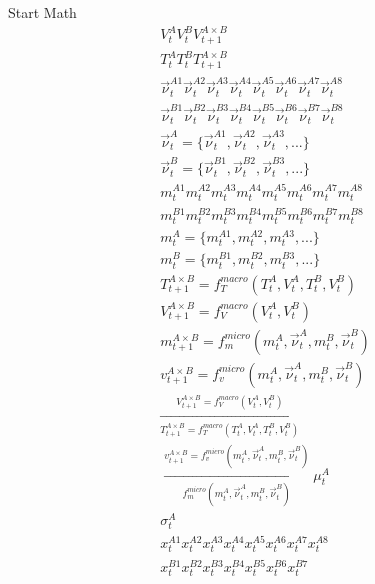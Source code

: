 \documentclass[utf8]{article}
\begin{document}
Start Math
\begin{align*}
&V_{t}^{A}
V_{t}^{B} 
V_{t+1}^{A\times B} \\&
T_{t}^{A}
T_{t}^{B}
T_{t+1}^{A\times B} \\&
\vec{\nu}_{t}^{A1}
\vec{\nu}_{t}^{A2}
\vec{\nu}_{t}^{A3}
\vec{\nu}_{t}^{A4}
\vec{\nu}_{t}^{A5}
\vec{\nu}_{t}^{A6}
\vec{\nu}_{t}^{A7}
\vec{\nu}_{t}^{A8} \\&
\vec{\nu}_{t}^{B1}
\vec{\nu}_{t}^{B2}
\vec{\nu}_{t}^{B3}
\vec{\nu}_{t}^{B4}
\vec{\nu}_{t}^{B5}
\vec{\nu}_{t}^{B6}
\vec{\nu}_{t}^{B7}
\vec{\nu}_{t}^{B8} \\&
\vec{\nu}^A_{t} = \{
\vec{\nu}_{t}^{A1},
\vec{\nu}_{t}^{A2},
\vec{\nu}_{t}^{A3},...\} \\&
\vec{\nu}^B_{t} = \{
\vec{\nu}_{t}^{B1},
\vec{\nu}_{t}^{B2},
\vec{\nu}_{t}^{B3},...\} \\&
{m}_{t}^{A1}
{m}_{t}^{A2}
{m}_{t}^{A3}
{m}_{t}^{A4}
{m}_{t}^{A5}
{m}_{t}^{A6}
{m}_{t}^{A7}
{m}_{t}^{A8} \\&
{m}_{t}^{B1}
{m}_{t}^{B2}
{m}_{t}^{B3}
{m}_{t}^{B4}
{m}_{t}^{B5}
{m}_{t}^{B6}
{m}_{t}^{B7}
{m}_{t}^{B8} \\&
{m}^A_{t} = \{
{m}_{t}^{A1},
{m}_{t}^{A2},
{m}_{t}^{A3},...\} \\&
{m}^B_{t} = \{
{m}_{t}^{B1},
{m}_{t}^{B2},
{m}_{t}^{B3},...\} \\&
T_{t+1}^{A\times B} = f_{T}^{macro}(T_{t}^{A}, V_{t}^{A}, T_{t}^{B}, V_{t}^{B}) \\&
V_{t+1}^{A\times B} = f_{V}^{macro}(V_{t}^{A}, V_{t}^{B}) \\&
{m}^{A\times B}_{t+1} = f_m^{micro}({m}^A_{t},\vec{\nu}^A_{t},{m}^B_{t},\vec{\nu}^B_{t}) \\&
{v}^{A\times B}_{t+1} = f_v^{micro}({m}^A_{t},\vec{\nu}^A_{t},{m}^B_{t},\vec{\nu}^B_{t}) \\&
\xrightarrow[T_{t+1}^{A\times B} = f_{T}^{macro}(T_{t}^{A}, V_{t}^{A}, T_{t}^{B}, V_{t}^{B})]{V_{t+1}^{A\times B} = f_{V}^{macro}(V_{t}^{A}, V_{t}^{B})} \\&
\xrightarrow[f_m^{micro}({m}^A_{t},\vec{\nu}^A_{t},{m}^B_{t},\vec{\nu}^B_{t})]{{v}^{A\times B}_{t+1} = f_v^{micro}({m}^A_{t},\vec{\nu}^A_{t},{m}^B_{t},\vec{\nu}^B_{t})}
{\mu}^A_{t} \\&
{\sigma}^A_{t} \\&
{x}_{t}^{A1}
{x}_{t}^{A2}
{x}_{t}^{A3}
{x}_{t}^{A4}
{x}_{t}^{A5}
{x}_{t}^{A6}
{x}_{t}^{A7}
{x}_{t}^{A8} \\&
{x}_{t}^{B1}
{x}_{t}^{B2}
{x}_{t}^{B3}
{x}_{t}^{B4}
{x}_{t}^{B5}
{x}_{t}^{B6}
{x}_{t}^{B7}

\end{align*}
\end{document}
